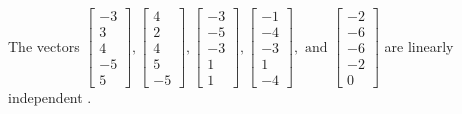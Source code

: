 \begin{exercise}
\begin{exerciseStatement}
  \end{exerciseStatement}
  \begin{exerciseAnswer}
   The vectors \(\left[\begin{array}{r}
-3 \\
3 \\
4 \\
-5 \\
5
\end{array}\right] , \left[\begin{array}{r}
4 \\
2 \\
4 \\
5 \\
-5
\end{array}\right] , \left[\begin{array}{r}
-3 \\
-5 \\
-3 \\
1 \\
1
\end{array}\right] , \left[\begin{array}{r}
-1 \\
-4 \\
-3 \\
1 \\
-4
\end{array}\right] , \text{ and } \left[\begin{array}{r}
-2 \\
-6 \\
-6 \\
-2 \\
0
\end{array}\right]\) are 
  	 linearly independent  .
  


  \end{exerciseAnswer}
\end{exercise}
